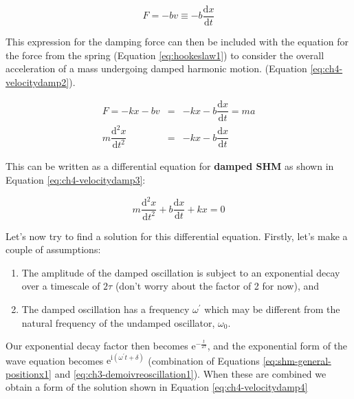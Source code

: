 \documentclass[
]{book}
\providecommand{\tightlist}{%
  \setlength{\itemsep}{0pt}\setlength{\parskip}{0pt}}
\begin{document}
\begin{equation}
F = -bv \equiv -b \frac{\mathrm{d}x}{\mathrm{d} t}
\label{eq:ch4-velocitydamp1}
\end{equation}

This expression for the damping force can then be included with the equation for the force from the spring (Equation \eqref{eq:hookeslaw1}) to consider the overall acceleration of a mass undergoing damped harmonic motion. (Equation \eqref{eq:ch4-velocitydamp2}).

\begin{equation}
\begin{array}{rcl}
F = -kx - bv &=& -kx -b \dfrac{\mathrm{d}x}{\mathrm{d}t} = ma \\
m \dfrac{\mathrm{d}^2 x}{\mathrm{d}t^2} &=& -kx -b \dfrac{\mathrm{d}x}{\mathrm{d}t}
\end{array}
\label{eq:ch4-velocitydamp2}
\end{equation}

This can be written as a differential equation for \textbf{damped SHM} as shown in Equation \eqref{eq:ch4-velocitydamp3}:

\begin{equation}
m \frac{\mathrm{d}^2 x}{\mathrm{d}t^2} + b \frac{\mathrm{d}x}{\mathrm{d}t}+ kx =0
\label{eq:ch4-velocitydamp3}
\end{equation}

Let's now try to find a solution for this differential equation. Firstly, let's make a couple of assumptions:

\begin{enumerate}
\def\labelenumi{\arabic{enumi}.}
\tightlist
\item
  The amplitude of the damped oscillation is subject to an exponential decay over a timescale of \(2\tau\) (don't worry about the factor of 2 for now), and
\item
  The damped oscillation has a frequency \(\omega^\prime\) which may be different from the natural frequency of the undamped oscillator, \(\omega_0\).
\end{enumerate}

Our exponential decay factor then becomes \(\mathrm{e}^{-\frac{t}{2\tau}}\), and the exponential form of the wave equation becomes \(\mathrm{e}^{\mathrm{i}(\omega^\prime t + \delta)}\) (combination of Equations \eqref{eq:shm-general-positionx1} and \eqref{eq:ch3-demoivreoscillation1}). When these are combined we obtain a form of the solution shown in Equation \eqref{eq:ch4-velocitydamp4}
\end{document}
